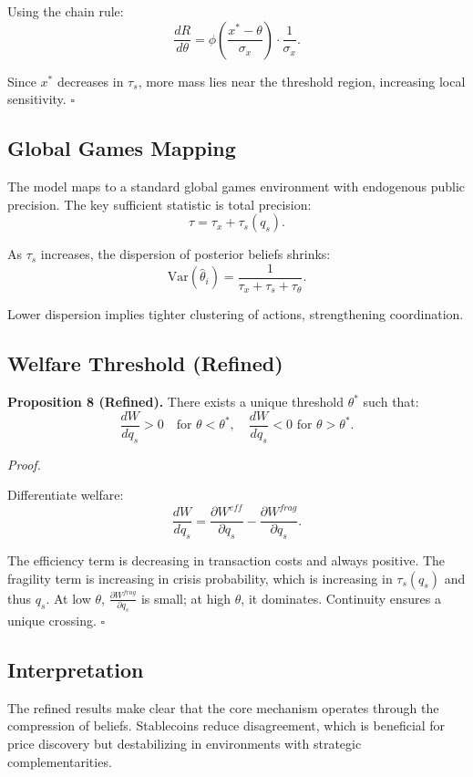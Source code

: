 Using the chain rule:
\begin{equation}
\frac{dR}{d\theta} = \phi\left(\frac{x^* - \theta}{\sigma_x}\right) \cdot \frac{1}{\sigma_x}.
\end{equation}

Since $x^*$ decreases in $\tau_s$, more mass lies near the threshold region, increasing local sensitivity. \hfill $\square$

\subsection{Global Games Mapping}

The model maps to a standard global games environment with endogenous public precision. The key sufficient statistic is total precision:
\begin{equation}
\tau = \tau_x + \tau_s(q_s).
\end{equation}

As $\tau_s$ increases, the dispersion of posterior beliefs shrinks:
\begin{equation}
\text{Var}(\hat{\theta}_i) = \frac{1}{\tau_x + \tau_s + \tau_\theta}.
\end{equation}

Lower dispersion implies tighter clustering of actions, strengthening coordination.

\subsection{Welfare Threshold (Refined)}

\textbf{Proposition 8 (Refined).} There exists a unique threshold $\theta^*$ such that:
\begin{equation}
\frac{dW}{dq_s} > 0 \quad \text{for } \theta < \theta^*, \quad \frac{dW}{dq_s} < 0 \text{ for } \theta > \theta^*.
\end{equation}

\textit{Proof.}

Differentiate welfare:
\begin{equation}
\frac{dW}{dq_s} = \frac{\partial W^{eff}}{\partial q_s} - \frac{\partial W^{frag}}{\partial q_s}.
\end{equation}

The efficiency term is decreasing in transaction costs and always positive. The fragility term is increasing in crisis probability, which is increasing in $\tau_s(q_s)$ and thus $q_s$. At low $\theta$, $\frac{\partial W^{frag}}{\partial q_s}$ is small; at high $\theta$, it dominates. Continuity ensures a unique crossing. \hfill $\square$

\subsection{Interpretation}

The refined results make clear that the core mechanism operates through the compression of beliefs. Stablecoins reduce disagreement, which is beneficial for price discovery but destabilizing in environments with strategic complementarities.

